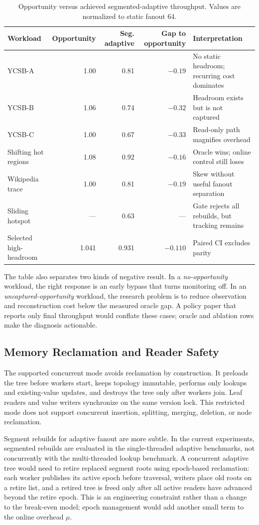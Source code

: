 \documentclass[sigconf,review,anonymous]{acmart}
\begin{document}
\begin{table}[t]
\centering
\caption{Opportunity versus achieved segmented-adaptive throughput.  Values
are normalized to static fanout 64.}
\label{tab:synthesis}
\begin{tabular}{lrrrl}
\toprule
Workload & Opportunity & Seg. adaptive & Gap to opportunity & Interpretation \\
\midrule
YCSB-A & 1.00 & 0.81 & $-0.19$ & No static headroom; recurring cost dominates \\
YCSB-B & 1.06 & 0.74 & $-0.32$ & Headroom exists but is not captured \\
YCSB-C & 1.00 & 0.67 & $-0.33$ & Read-only path magnifies overhead \\
Shifting hot regions & 1.08 & 0.92 & $-0.16$ & Oracle wins; online control still loses \\
Wikipedia trace & 1.00 & 0.81 & $-0.19$ & Skew without useful fanout separation \\
Sliding hotspot & --- & 0.63 & --- & Gate rejects all rebuilds, but tracking remains \\
Selected high-headroom & 1.041 & 0.931 & $-0.110$ & Paired CI excludes parity \\
\bottomrule
\end{tabular}
\end{table}

The table also separates two kinds of negative result.  In a
\emph{no-opportunity} workload, the right response is an early bypass that
turns monitoring off.  In an \emph{uncaptured-opportunity} workload, the
research problem is to reduce observation and reconstruction cost below the
measured oracle gap.  A policy paper that reports only final throughput would
conflate these cases; oracle and ablation rows make the diagnosis actionable.

\subsection{Memory Reclamation and Reader Safety}

The supported concurrent mode avoids reclamation by construction.  It preloads
the tree before workers start, keeps topology immutable, performs only lookups
and existing-value updates, and destroys the tree only after workers join.
Leaf readers and value writers synchronize on the same version lock.  This
restricted mode does not support concurrent insertion, splitting, merging,
deletion, or node reclamation.

Segment rebuilds for adaptive fanout are more subtle.  In the current
experiments, segmented rebuilds are evaluated in the single-threaded adaptive
benchmarks, not concurrently with the multi-threaded lookup benchmark.  A
concurrent adaptive tree would need to retire replaced segment roots using
epoch-based reclamation: each worker publishes its active epoch before
traversal, writers place old roots on a retire list, and a retired tree is
freed only after all active readers have advanced beyond the retire epoch.
This is an engineering constraint rather than a change to the break-even
model; epoch management would add another small term to the online overhead
\(\mu\).
\end{document}
